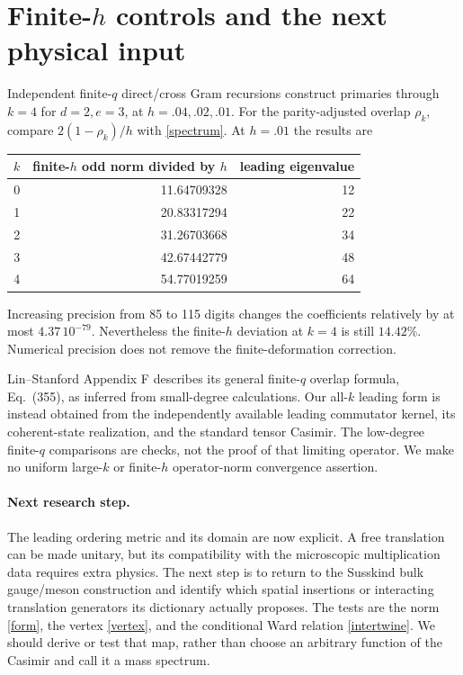 \documentclass[11pt,a4paper]{article}
\begin{document}
\newpage
\appendix
\section{Finite-$h$ controls and the next physical input}
Independent finite-$q$ direct/cross Gram recursions construct primaries
through $k=4$ for $d=2,e=3$, at $h=.04,.02,.01$. For the parity-adjusted
overlap $\rho_k$, compare $2(1-\rho_k)/h$ with \eqref{spectrum}.
At $h=.01$ the results are
\begin{center}
\begin{tabular}{rrr}
\toprule
$k$&finite-$h$ odd norm divided by $h$&leading eigenvalue\\\midrule
0&11.64709328&12\\
1&20.83317294&22\\
2&31.26703668&34\\
3&42.67442779&48\\
4&54.77019259&64\\\bottomrule
\end{tabular}
\end{center}
Increasing precision from 85 to 115 digits changes the coefficients
relatively by at most $4.37\,10^{-79}$. Nevertheless the finite-$h$
deviation at $k=4$ is still $14.42\%$. Numerical precision does not
remove the finite-deformation correction.

Lin--Stanford Appendix F describes its general finite-$q$ overlap
formula, Eq.~(355), as inferred from small-degree calculations.
Our all-$k$ leading form is instead obtained from the independently
available leading commutator kernel, its coherent-state realization,
and the standard tensor Casimir. The low-degree finite-$q$ comparisons
are checks, not the proof of that limiting operator. We make no uniform
large-$k$ or finite-$h$ operator-norm convergence assertion.

\paragraph{Next research step.}
The leading ordering metric and its domain are now explicit. A free
translation can be made unitary, but its compatibility with the
microscopic multiplication data requires extra physics. The next step
is to return to the Susskind bulk gauge/meson construction and identify
which spatial insertions or interacting translation generators its
dictionary actually proposes. The tests are the norm \eqref{form},
the vertex \eqref{vertex}, and the conditional Ward relation
\eqref{intertwine}. We should derive or test that map, rather than choose
an arbitrary function of the Casimir and call it a mass spectrum.
\end{document}
